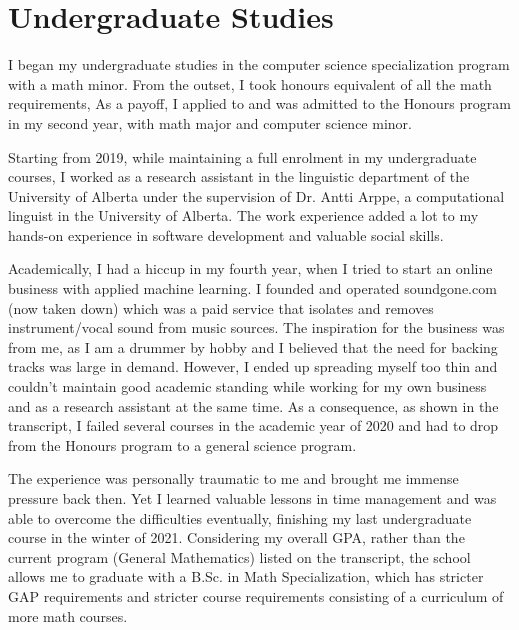 \section*{Undergraduate Studies}

I began my undergraduate studies in the computer science specialization program with a math minor.
From the outset, I took honours equivalent of all the math requirements,
As a payoff, I applied to and was admitted to the Honours program in my second year,
with math major and computer science minor.

Starting from 2019, while maintaining a full enrolment in my undergraduate courses,
I worked as a research assistant in the linguistic department of the University of Alberta
under the supervision of Dr. Antti Arppe, a computational linguist in the University of Alberta.
The work experience added a lot to my hands-on experience in software development and valuable social skills.

Academically, I had a hiccup in my fourth year,
when I tried to start an online business with applied machine learning.
I founded and operated soundgone.com (now taken down) which was a paid service that isolates and removes instrument/vocal sound
from music sources.
The inspiration for the business was from me, as I am a drummer by hobby and I believed that
the need for backing tracks was large in demand.
However, I ended up spreading myself too thin and couldn't maintain good academic standing
while working for my own business and as a research assistant at the same time.
As a consequence, as shown in the transcript,
I failed several courses in the academic year of 2020 and had to drop from the Honours program to a general science program.

The experience was personally traumatic to me and brought me immense pressure back then.
Yet I learned valuable lessons in time management and was able to overcome the difficulties eventually,
finishing my last undergraduate course in the winter of 2021.
Considering my overall GPA,
rather than the current program (General Mathematics) listed on the transcript,
the school allows me to graduate with a B.Sc. in Math Specialization,
which has stricter GAP requirements and stricter course requirements consisting of a curriculum of more math courses.
